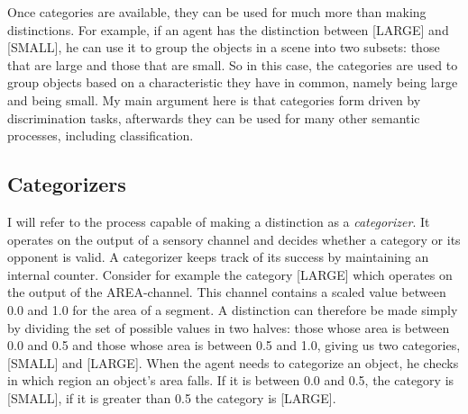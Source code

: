 Once categories are available, they can be 
used for much more than making distinctions. For example, 
if an agent has the distinction between [LARGE] and [SMALL],
he can use it to group the objects in a scene into two
subsets: those that are large and those that are small. 
So in this case, the categories are used to group 
objects based on a characteristic they have in common, 
namely being large and being small. My main argument here is that 
categories form driven by discrimination tasks,
afterwards they can be used for many other 
semantic processes, including classification. 

\subsection{Categorizers}

I will refer to the process capable of making a distinction as
a {\it categorizer}. \cite{categorizer} It operates on the output of 
a sensory channel and decides whether a category or its opponent
is valid. A categorizer keeps track of its success 
by maintaining an internal counter. 
Consider for example the category [LARGE] which 
operates on the output of the AREA-channel. This channel 
contains a scaled value 
between 0.0 and 1.0 for the area of a segment. A distinction 
can therefore be 
made simply by dividing the set of possible values in two
halves: those whose area is between
0.0 and 0.5 and those whose area is between 0.5 and
1.0, giving us two categories, [SMALL] and [LARGE]. When 
the agent needs to categorize an object, he checks in which
region an object's area falls. If it is between 0.0 and 0.5, the
category is [SMALL], if it is greater than 0.5 the category
is [LARGE]. 

